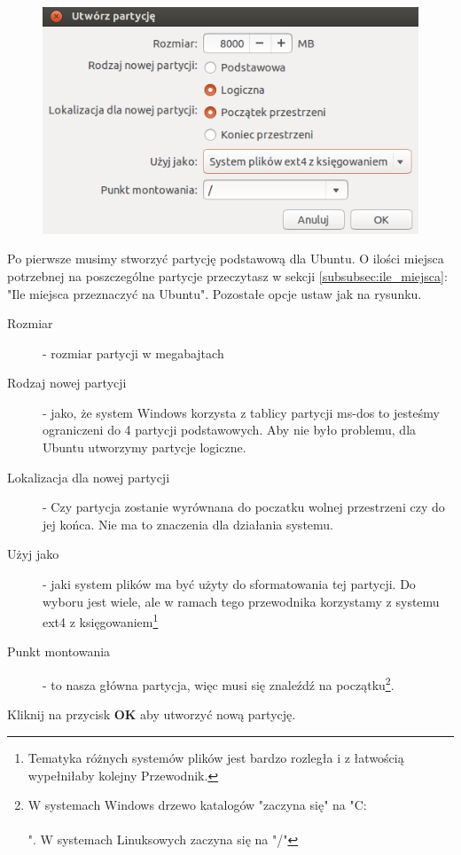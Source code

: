 \begin{figure}
		\includegraphics[scale=0.8]{images/instalator_partycjonowanie_gparted_dodaj_root.png}
\end{figure}
Po pierwsze musimy stworzyć partycję podstawową dla Ubuntu. O ilości miejsca potrzebnej na poszczególne partycje przeczytasz w sekcji \ref{subsubsec:ile_miejsca}: "Ile miejsca przeznaczyć na Ubuntu". Pozostałe opcje ustaw jak na rysunku.
\begin{description}
\item[Rozmiar] - rozmiar partycji w megabajtach
\item[Rodzaj nowej partycji] - jako, że system Windows korzysta z tablicy partycji ms-dos to jesteśmy ograniczeni do 4 partycji podstawowych. Aby nie było problemu, dla Ubuntu utworzymy partycje logiczne.
\item[Lokalizacja dla nowej partycji] - Czy partycja zostanie wyrównana do poczatku wolnej przestrzeni czy do jej końca. Nie ma to znaczenia dla działania systemu.
\item[Użyj jako] - jaki system plików ma być użyty do sformatowania tej partycji. Do wyboru jest wiele, ale w ramach tego przewodnika korzystamy z systemu ext4 z księgowaniem\footnote{Tematyka różnych systemów plików jest bardzo rozległa i z łatwością wypełniłaby kolejny Przewodnik.}
\item[Punkt montowania] - to nasza główna partycja, więc musi się znaleźdź na początku\footnote{W systemach Windows drzewo katalogów "zaczyna się" na "C:\\\\". W systemach Linuksowych zaczyna się na "/"}.
\end{description}
Kliknij na przycisk \textbf{OK} aby utworzyć nową partycję.
\clearpage
